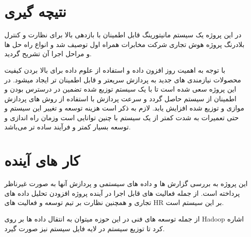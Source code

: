 \documentclass{llncs}
\begin{document}
\section{نتیچه گیری}
در این پروژه یک سیستم مانیتورینگ قابل اطمینان با بازدهی بالا برای نظارت و کنترل بلادرنگ پروژه هوش تجاری شرکت مخابرات همراه اول توصیف شد و انواع راه حل ها و مراحل اجرا آن تشریح گردید.

با توجه به اهمیت روز افزون داده و استفاده از علوم داده برای بالا بردن کیفیت محصولات نیازمندی های جدید به پردازش سریعتر و قابل اطمینان تر ایجاد میشود. در این پروژه سعی شده است تا با یک سیستم توزیع شده تضمین در درسترس بودن و اطمینان از سیستم حاصل گردد و سرعت پردازش با استفاده از روش های پردازش موازی و توزیع شده افزایش یابد. لازم به ذکر است هزینه توسعه و تغییر این سیستم و حتی تعمیرات به شدت کمتر از یک سیستم با چنین توانایی است وزمان راه اندازی و توسعه بسیار کمتر و فرآیند ساده تر می‌باشد.

\section{کار های آینده}

این پروژه به بررسی گزارش ها و داده های سیستمی و پردازش آنها به صورت غیرناظر پرداخته است. از جمله فعالیت های قابل اجرا در آینده پروژه افزودن تحلیل داده های تجاری و همچنین نظارت بر تیم توسعه و فعالیت های HR بر این سیستم است.

از جمله توسعه های فنی در این حوزه میتوان به انتقال داده ها بر روی Hadoop اشاره کرد تا توزیع سیستم در لایه فایل سیستم نیز صورت گیرد.
\end{document}
